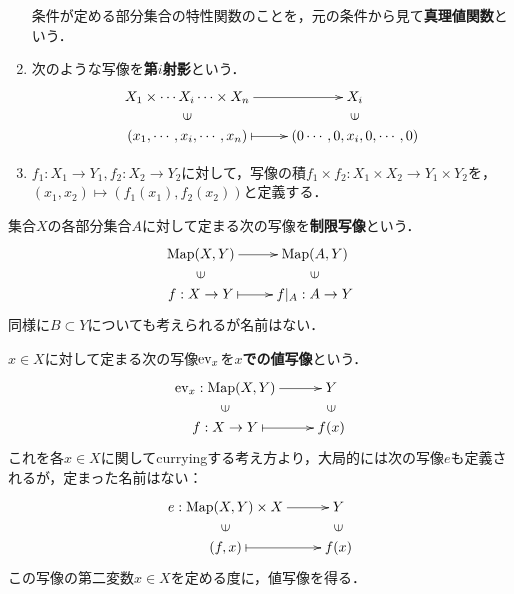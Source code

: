 \documentclass[uplatex, 12pt, dvipdfmx]{jsreport}
\begin{document}
\begin{example}
\begin{enumerate}
        条件が定める部分集合の特性関数のことを，元の条件から見て\textbf{真理値関数}という．
        \item 次のような写像を\textbf{第$i$射影}という．\[\xymatrix@R-2pc{
            X_1\times\cdots X_i\cdots\times X_n\ar[r]&X_i\\
            \rotatebox[origin=c]{90}{$\in$}&\rotatebox[origin=c]{90}{$\in$}\\
            (x_1,\cdots,x_i,\cdots,x_n)\ar@{|->}[r]&(0\cdots,0,x_{i},0,\cdots,0)
        }\]
        \item $f_1:X_1\to Y_1,f_2:X_2\to Y_2$に対して，写像の積$f_1\times f_2:X_1\times X_2\to Y_1\times Y_2$を，$(x_1,x_2)\mapsto (f_1(x_1),f_2(x_2))$と定義する．
    \end{enumerate}
\end{example}

\begin{definition}
	集合$X$の各部分集合$A$に対して定まる次の写像を\textbf{制限写像}という．
    \[\xymatrix@R-2pc{
        \Map(X,Y)\ar[r]&\Map(A,Y)\\
        \rotatebox[origin=c]{90}{$\in$}&\rotatebox[origin=c]{90}{$\in$}\\
        f:X\to Y\ar@{|->}[r]&f|_A:A\to Y
    }\]
    同様に$B\subset Y$についても考えられるが名前はない．
\end{definition}
\begin{definition}
	$x\in X$に対して定まる次の写像$\mathrm{ev}_x$を\textbf{$x$での値写像}という．
    \[\xymatrix@R-2pc{
        \ev_x:\Map(X,Y)\ar[r]&Y\\
        \rotatebox[origin=c]{90}{$\in$}&\rotatebox[origin=c]{90}{$\in$}\\
        f:X\to Y\ar@{|->}[r]&f(x)
    }\]
	これを各$x\in X$に関してcurryingする考え方より，大局的には次の写像$e$も定義されるが，定まった名前はない：
    \[\xymatrix@R-2pc{
        e:\Map(X,Y)\times X\ar[r]&Y\\
        \rotatebox[origin=c]{90}{$\in$}&\rotatebox[origin=c]{90}{$\in$}\\
        (f,x)\ar@{|->}[r]&f(x)
    }\]
	この写像の第二変数$x\in X$を定める度に，値写像を得る．
\end{definition}
\end{document}
